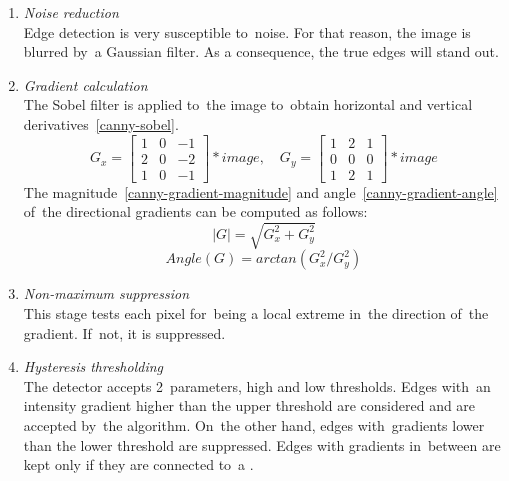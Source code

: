 \begin{enumerate}[topsep=0pt,itemsep=-1.5pt,partopsep=6pt]
  \item \emph{Noise reduction}\\
  Edge detection is very susceptible to~noise. For that reason, the image is blurred by~a Gaussian filter. As a consequence, the true edges will stand out.
  \item \emph{Gradient calculation}\\
  The Sobel filter is applied to~the image to~obtain horizontal and vertical derivatives~\ref{canny-sobel}.
  \begin{equation}
  \label{canny-sobel}
  G_x = \begin{bmatrix}
            1 & 0 & -1\\
            2 & 0 & -2\\
            1 & 0 & -1
        \end{bmatrix} * image, \quad
  G_y = \begin{bmatrix}
            1 & 2 & 1\\
            0 & 0 & 0\\
            1 & 2 & 1
        \end{bmatrix} * image
  \end{equation}
  The magnitude~\ref{canny-gradient-magnitude} and angle~\ref{canny-gradient-angle} of~the directional gradients can be computed as follows:
  \begin{equation}
  \label{canny-gradient-magnitude}
  |G| = \sqrt{G_x^2 + G_y^2}
  \end{equation}
  \begin{equation}
  \label{canny-gradient-angle}
  Angle(G) = arctan(G_x^2/G_y^2)
  \end{equation}
  \item \emph{Non-maximum suppression}\\
  This stage tests each pixel for~being a local extreme in~the direction of~the gradient. If~not, it is suppressed.
  \item \emph{Hysteresis thresholding}\\
  The detector accepts 2~parameters, high and low thresholds. Edges with~an intensity gradient higher than the upper threshold are considered  and are accepted by~the algorithm. On~the other hand, edges with~gradients lower than the lower threshold are suppressed. Edges with gradients in~between are kept only if they are connected to~a .
\end{enumerate}

